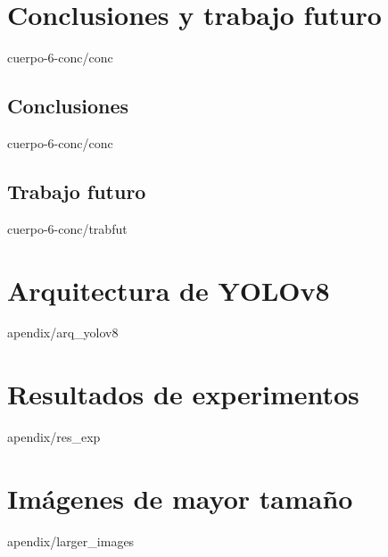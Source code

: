 \documentclass[epsbased,copyright,final,printable,covers,extendedindex,firstnumbered,tfg,gnuplot]{tfgtfmthesisuam}
\begin{document}
\chapter{Conclusiones y trabajo futuro\label{CAP:CONC}}{cuerpo-6-conc/conc}
  \section{Conclusiones\label{SEC:CONC_S1}}{cuerpo-6-conc/conc}
  \section{Trabajo futuro\label{SEC:TRABFUT_S1}}{cuerpo-6-conc/trabfut}



\appendix
\chapter{Arquitectura de YOLOv8\label{CAP:ARQ_YOLO}}{apendix/arq_yolov8}
\chapter{Resultados de experimentos\label{CAP:RES_EXP}}{apendix/res_exp}
\chapter{Imágenes de mayor tamaño\label{CAP:IMAGENES}}{apendix/larger_images}
\end{document}
